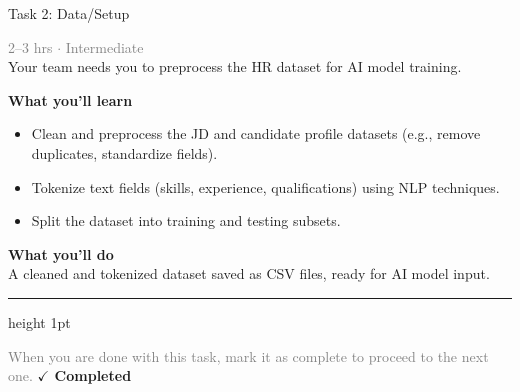 \documentclass[10pt,a4paper]{article}
\begin{document}
\begin{taskbox}{Task 2: Data/Setup}

    {\small \textcolor{gray}{2--3 hrs $\cdot$ Intermediate}}\\[12pt]

     Your team needs you to preprocess the HR dataset for AI model training.  


\vspace{8pt}
{\large \textbf{\textcolor{brandLight}{What you'll learn}}}\\[4pt]  
\begin{itemize}
    \item Clean and preprocess the JD and candidate profile datasets (e.g., remove duplicates, standardize fields).  
    \item Tokenize text fields (skills, experience, qualifications) using NLP techniques.  
    \item Split the dataset into training and testing subsets.  
\end{itemize}

\vspace{8pt}
{\large \textbf{\textcolor{brandLight}{What you'll do}}}\\[4pt]  
A cleaned and tokenized dataset saved as CSV files, ready for AI model input.\par

    \vspace{16pt}

    \textcolor{cardBorder}{\hrule height 1pt}\vspace{8pt}

    \small \textcolor{gray}{When you are done with this task, mark it as complete to proceed to the next one.} \hfill \textbf{\textcolor{brandDark}{$\checkmark$ Completed}}

\end{taskbox}
\end{document}
